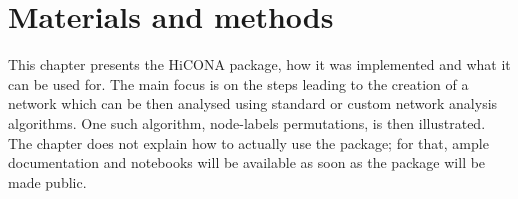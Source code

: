 \graphicspath{{chapters/04_materials_and_methods/images/}}
\chapter{Materials and methods}


This chapter presents the HiCONA package, how it was implemented and what it can be used for. The main focus is on the steps leading to the creation of a network which can be then analysed using standard or custom network analysis algorithms. One such algorithm, node-labels permutations, is then illustrated. The chapter does not explain how to actually use the package; for that, ample documentation and notebooks will be available as soon as the package will be made public.


